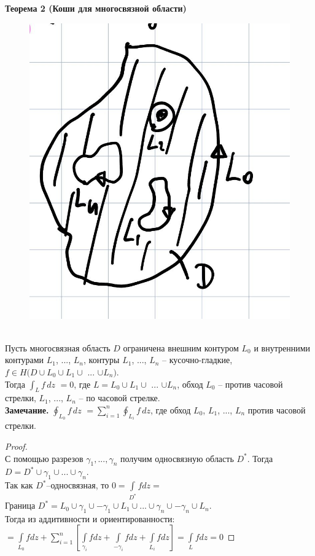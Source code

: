 \textbf{Теорема 2 (Коши для многосвязной области)}\\
\begin{figure}[!ht]
\begin{center}
\includegraphics[scale=0.2]{answers/img/pic3.jpg}
\end{center}
\end{figure}\\
Пусть многосвязная область $D$ ограничена внешним контуром $L_0$ и внутренними контурами $L_1$, ..., $L_n$, контуры $L_1$, ..., $L_n$ -- кусочно-гладкие, $f \in H(D \cup L_0 \cup L_1 \cup$ ... $\cup L_n)$.\\
Тогда \(\int_L f\, dz\) $= 0$, где $L = L_0 \cup L_1 \cup$ ... $\cup L_n$, обход $L_0$ -- против часовой стрелки, $L_1$, ..., $L_n$ -- по часовой стрелке.\\
\textbf{Замечание.} \(\oint_{L_0} f\, dz\) 
$= \sum_{i = 1}^{n}$\(\oint_{L_i} f\, dz\), где обход $L_0$, $L_1$, ..., $L_n$ против часовой стрелки.


\begin{proof}
    \ \\
    С помощью разрезов $\gamma_1, ..., \gamma_n$ получим односвязную область $D^*$. Тогда $D=D^*\cup\gamma_1\cup...\cup\gamma_n$.\\
    Так как $D^*$--односвязная, то $0=\int\limits_{D^*}fdz = $\\
    Граница $D^* = L_0\cup\gamma_1\cup-\gamma_1\cup L_1 \cup...\cup\gamma_n\cup-\gamma_n\cup L_n$.\\
    Тогда из аддитивности и ориентированности:\\
    $=\int\limits_{L_0}fdz+\sum_{i=1}^n\left[ \int\limits_{\gamma_i}fdz+\int\limits_{-\gamma_i}fdz+\int\limits_{L_i}fdz \right] = \int\limits_{L}fdz=0$
\end{proof}
